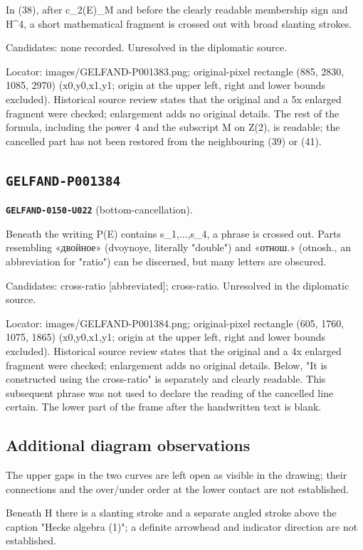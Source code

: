 \documentclass[11pt]{article}
\theoremstyle{definition}
\theoremstyle{remark}
\begin{document}
In (38), after c\_2(E)\_M and before the clearly readable membership sign and H\textasciicircum{}4, a short mathematical fragment is crossed out with broad slanting strokes.\par
Candidates: none recorded. Unresolved in the diplomatic source.\par
Locator: images/GELFAND-P001383.png; original-pixel rectangle (885, 2830, 1085, 2970) (x0,y0,x1,y1; origin at the upper left, right and lower bounds excluded). Historical source review states that the original and a 5x enlarged fragment were checked; enlargement adds no original details. The rest of the formula, including the power 4 and the subscript M on Z(2), is readable; the cancelled part has not been restored from the neighbouring (39) or (41).\par\medskip

\subsection*{\texttt{GELFAND-P001384}}
\noindent\leavevmode{}\label{GELFAND-P001384:bottom-cancellation:note}\textbf{\texttt{GELFAND-0150-U022}} (bottom-cancellation).\par\nopagebreak[4]
Beneath the writing P(E) contains s\_1,...,s\_4, a phrase is crossed out. Parts resembling «двойное» (dvoynoye, literally "double") and «отнош.» (otnosh., an abbreviation for "ratio") can be discerned, but many letters are obscured.\par
Candidates: cross-ratio [abbreviated]; cross-ratio. Unresolved in the diplomatic source.\par
Locator: images/GELFAND-P001384.png; original-pixel rectangle (605, 1760, 1075, 1865) (x0,y0,x1,y1; origin at the upper left, right and lower bounds excluded). Historical source review states that the original and a 4x enlarged fragment were checked; enlargement adds no original details. Below, "It is constructed using the cross-ratio" is separately and clearly readable. This subsequent phrase was not used to declare the reading of the cancelled line certain. The lower part of the frame after the handwritten text is blank.\par\medskip
\subsection*{Additional diagram observations}
\label{GELFAND-P001375:braids-links-connectivity:note}
The upper gaps in the two curves are left open as visible in the drawing; their connections and the over/under order at the lower contact are not established.\par
{}\label{GELFAND-P001375:hecke-indicator:note}
Beneath H there is a slanting stroke and a separate angled stroke above the caption "Hecke algebra (1)"; a definite arrowhead and indicator direction are not established.\par
\end{document}
